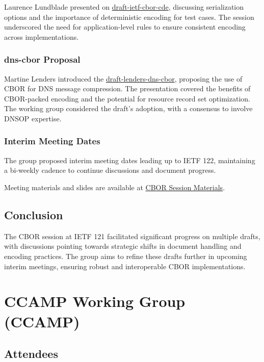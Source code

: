 \documentclass{article}
\begin{document}
Laurence Lundblade presented on \href{https://datatracker.ietf.org/doc/html/draft-ietf-cbor-cde}{draft-ietf-cbor-cde}, discussing serialization options and the importance of deterministic encoding for test cases. The session underscored the need for application-level rules to ensure consistent encoding across implementations.

\subsubsection{dns-cbor Proposal}

Martine Lenders introduced the \href{https://datatracker.ietf.org/doc/draft-lenders-dns-cbor/}{draft-lenders-dns-cbor}, proposing the use of CBOR for DNS message compression. The presentation covered the benefits of CBOR-packed encoding and the potential for resource record set optimization. The working group considered the draft's adoption, with a consensus to involve DNSOP expertise.

\subsubsection{Interim Meeting Dates}

The group proposed interim meeting dates leading up to IETF 122, maintaining a bi-weekly cadence to continue discussions and document progress.

Meeting materials and slides are available at \href{https://datatracker.ietf.org/meeting/121/materials/slides-121-cbor-chairs-slides-01.pdf}{CBOR Session Materials}.

\subsection{Conclusion}

The CBOR session at IETF 121 facilitated significant progress on multiple drafts, with discussions pointing towards strategic shifts in document handling and encoding practices. The group aims to refine these drafts further in upcoming interim meetings, ensuring robust and interoperable CBOR implementations.



\newpage

\section{CCAMP Working Group (CCAMP)}

\subsection{Attendees}
\end{document}
